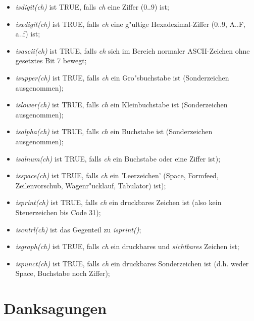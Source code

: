 \documentclass[12pt,a4paper,twoside]{report}
\begin{document}
{\begin{itemize}
\item{{\em isdigit(ch)} ist TRUE, falls {\em ch} eine Ziffer (0..9)
      ist;}
\item{{\em isxdigit(ch)} ist TRUE, falls {\em ch} eine g"ultige
      Hexadezimal-Ziffer (0..9, A..F, a..f) ist;}
\item{{\em isascii(ch)} ist TRUE, falls {\em ch} sich im Bereich 
      normaler ASCII-Zeichen ohne gesetztes Bit 7 bewegt;}
\item{{\em isupper(ch)} ist TRUE, falls {\em ch} ein Gro"sbuchstabe
      ist (Sonderzeichen ausgenommen);}
\item{{\em islower(ch)} ist TRUE, falls {\em ch} ein Kleinbuchstabe
      ist (Sonderzeichen ausgenommen);}
\item{{\em isalpha(ch)} ist TRUE, falls {\em ch} ein Buchstabe ist
      (Sonderzeichen ausgenommen);}
\item{{\em isalnum(ch)} ist TRUE, falls {\em ch} ein Buchstabe oder
      eine Ziffer ist);}
\item{{\em isspace(ch)} ist TRUE, falls {\em ch} ein 'Leerzeichen'
      (Space, Formfeed, Zeilenvorschub, Wagenr"ucklauf, Tabulator)
      ist);}
\item{{\em isprint(ch)} ist TRUE, falls {\em ch} ein druckbares
      Zeichen ist (also kein Steuerzeichen bis Code 31);}
\item{{\em iscntrl(ch)} ist das Gegenteil zu {\em isprint()};}
\item{{\em isgraph(ch)} ist TRUE, falls {\em ch} ein druckbares
      und {\it sichtbares} Zeichen ist;}
\item{{\em ispunct(ch)} ist TRUE, falls {\em ch} ein druckbares
      Sonderzeichen ist (d.h. weder Space, Buchstabe noch Ziffer);}
\end{itemize}


\cleardoublepage
\chapter{Danksagungen}

}
\end{document}
